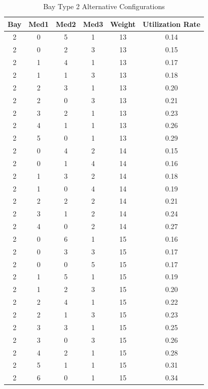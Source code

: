 \documentclass{mcmthesis}
\begin{document}
\begin{appendices}
\begin{table}[htbp]
  \centering
  \caption{Bay Type 2 Alternative Configurations}
    \begin{tabular}{c|c|c|c|c|c}
\hline
    \multicolumn{1}{l}{Bay} & \multicolumn{1}{l}{Med1} & \multicolumn{1}{l}{Med2} & \multicolumn{1}{l}{Med3} & \multicolumn{1}{l}{Weight} & \multicolumn{1}{l}{Utilization Rate} \\
\hline
    2     & 0     & 5     & 1     & 13    & 0.14  \\
    2     & 0     & 2     & 3     & 13    & 0.15  \\
    2     & 1     & 4     & 1     & 13    & 0.17  \\
    2     & 1     & 1     & 3     & 13    & 0.18  \\
    2     & 2     & 3     & 1     & 13    & 0.20  \\
    2     & 2     & 0     & 3     & 13    & 0.21  \\
    2     & 3     & 2     & 1     & 13    & 0.23  \\
    2     & 4     & 1     & 1     & 13    & 0.26  \\
    2     & 5     & 0     & 1     & 13    & 0.29  \\
    2     & 0     & 4     & 2     & 14    & 0.15  \\
    2     & 0     & 1     & 4     & 14    & 0.16  \\
    2     & 1     & 3     & 2     & 14    & 0.18  \\
    2     & 1     & 0     & 4     & 14    & 0.19  \\
    2     & 2     & 2     & 2     & 14    & 0.21  \\
    2     & 3     & 1     & 2     & 14    & 0.24  \\
    2     & 4     & 0     & 2     & 14    & 0.27  \\
    2     & 0     & 6     & 1     & 15    & 0.16  \\
    2     & 0     & 3     & 3     & 15    & 0.17  \\
    2     & 0     & 0     & 5     & 15    & 0.17  \\
    2     & 1     & 5     & 1     & 15    & 0.19  \\
    2     & 1     & 2     & 3     & 15    & 0.20  \\
    2     & 2     & 4     & 1     & 15    & 0.22  \\
    2     & 2     & 1     & 3     & 15    & 0.23  \\
    2     & 3     & 3     & 1     & 15    & 0.25  \\
    2     & 3     & 0     & 3     & 15    & 0.26  \\
    2     & 4     & 2     & 1     & 15    & 0.28  \\
    2     & 5     & 1     & 1     & 15    & 0.31  \\
    2     & 6     & 0     & 1     & 15    & 0.34  \\
\hline
    \end{tabular}%
  \label{tab:addlabel}%
\end{table}%



\end{appendices}
\end{document}
